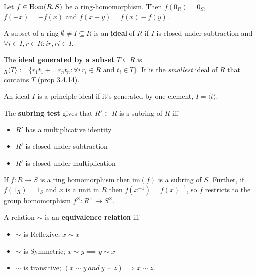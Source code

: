 \begin{multicols}{2}
\begin{theorem}[3.4.5]
Let $f\in\mathrm{Hom}(R,S)$ be a ring-homomorphism. Then $f(0_R)=0_S$, $f(-x)=-f(x)$ and $f(x-y)=f(x)-f(y)$.
\end{theorem}

\begin{definition}
A subset of a ring $\emptyset\neq I\subseteq R$ is an \textbf{ideal} of $R$ if $I$ is closed under subtraction and $\forall i\in I,r\in R: ir,ri\in I$. 
\end{definition}

\begin{definition}
The \textbf{ideal generated by a subset} $T\subseteq R$ is $_R\langle T\rangle := \{r_1t_1 + \dots r_nt_n : \forall i\, r_i\in R\text{ and } t_i\in T\}$. It is the \textit{smallest} ideal of $R$ that contains $T$ (prop 3.4.14).
\end{definition}

\begin{definition}
An ideal $I$ is a principle ideal if it's generated by one element, $I=\langle t\rangle$.
\end{definition}

\begin{theorem}
The \textbf{subring test} gives that $R'\subset R$ is a subring of $R$ iff
\begin{itemize}
    \item $R'$ has a multiplicative identity
    \item $R'$ is closed under subtraction
    \item $R'$ is closed under multiplication
\end{itemize}
\end{theorem}

\begin{theorem}[2.4.29]
If $f:R\to S$ is a ring homomorphism then $\text{im}(f)$ is a subring of $S$. Further, if $f(1_R)=1_S$ and $x$ is a unit in $R$ then $f(x^{-1})=f(x)^{-1}$, so $f$ restricts to the group homomorphism $f^\times: R^\times \to S^\times$.
\end{theorem}

\begin{definition}
A relation $\sim$ is an \textbf{equivalence relation} iff
\begin{itemize}
    \item $\sim$ is Reflexive; $x\sim x$
    \item $\sim$ is Symmetric; $x\sim y \implies y\sim x$
    \item $\sim$ is transitive; $(x\sim y\ and\ y\sim z)\implies x\sim z$.
\end{itemize}
\end{definition}


\end{multicols}
